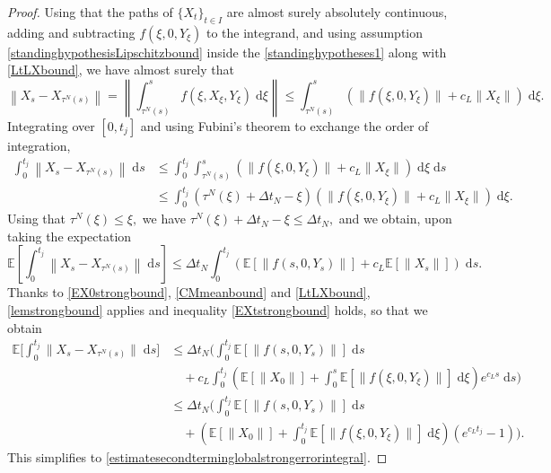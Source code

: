 \documentclass[reqno,12pt]{amsart}
\theoremstyle{plain} %
\theoremstyle{definition} %
\begin{document}
\begin{proof}
    Using that the paths of $\{X_t\}_{t\in I}$ are almost surely absolutely continuous, adding and subtracting $f(\xi, 0, Y_\xi)$ to the integrand, and using assumption \eqref{standinghypothesisLipschitzbound} inside the \cref{standinghypotheses1} along with \cref{LtLXbound}, we have almost surely that
    \[
      \left\|X_s - X_{\tau^N(s)}\right\| = \left\|\int_{\tau^N(s)}^s f(\xi, X_\xi, Y_\xi)\;\mathrm{d}\xi\right\| \leq \int_{\tau^N(s)}^s \left(\|f(\xi, 0, Y_\xi)\| + c_L\|X_\xi\|\right)\;\mathrm{d}\xi.
    \]
    Integrating over $[0, t_j]$ and using Fubini's theorem to exchange the order of integration,
    \begin{align*}
        \int_0^{t_j} \left\|X_s - X_{\tau^N(s)}\right\| \;\mathrm{d}s & \leq \int_0^{t_j}\int_{\tau^N(s)}^s (\|f(\xi, 0, Y_\xi)\| + c_L\|X_\xi\|) \;\mathrm{d}\xi \;\mathrm{d}s \\
        & \leq \int_0^{t_j} (\tau^N(\xi) + \Delta t_N - \xi) (\|f(\xi, 0, Y_\xi)\| + c_L\|X_\xi\|) \;\mathrm{d}\xi.
    \end{align*}
    Using that $\tau^N(\xi) \leq \xi,$ we have $\tau^N(\xi) + \Delta t_N - \xi \leq \Delta t_N,$ and we obtain, upon taking the expectation
    \[
        \mathbb{E}\left[\int_0^{t_j}\left\|X_s - X_{\tau^N(s)}\right\| \;\mathrm{d}s\right] \leq \Delta t_N \int_0^{t_j} \left(\mathbb{E}\left[\|f(s, 0, Y_s)\|\right] + c_L\mathbb{E}\left[\|X_s\|\right]\right) \;\mathrm{d}s.
    \]
    Thanks to \cref{EX0strongbound}, \cref{CMmeanbound} and \cref{LtLXbound}, \cref{lemstrongbound} applies and inequality \cref{EXtstrongbound} holds, so that we obtain
    \begin{align*}
        \mathbb{E}\bigg[\int_0^{t_j}  \|X_s - X_{\tau^N(s)}\| \;\mathrm{d}s\bigg] & \leq \Delta t_N  \bigg(\int_0^{t_j} \mathbb{E}[\|f(s, 0, Y_s)\|] \;\mathrm{d}s \\
        & \quad + c_L\int_0^{t_j}\left(\mathbb{E}[\|X_0\|] + \int_0^s \mathbb{E}[\|f(\xi, 0, Y_\xi)\|]\;\mathrm{d}\xi\right)e^{c_L s} \;\mathrm{d}s\bigg) \\
        & \leq \Delta t_N  \bigg(\int_0^{t_j} \mathbb{E}[\|f(s, 0, Y_s)\|] \;\mathrm{d}s \\
        & \quad + \left(\mathbb{E}[\|X_0\|] + \int_0^{t_j} \mathbb{E}[\|f(\xi, 0, Y_\xi)\|]\;\mathrm{d}\xi\right)\left(e^{c_L t_j} - 1\right) \bigg).
    \end{align*}
    This simplifies to \cref{estimatesecondterminglobalstrongerrorintegral}.
\end{proof}
\end{document}
